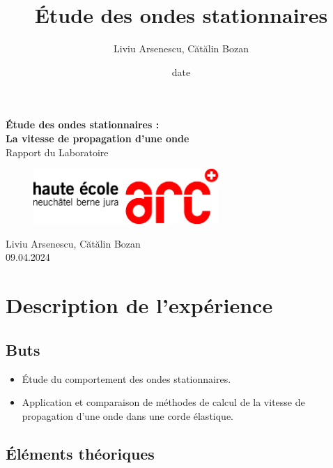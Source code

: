 \documentclass[12pt,a4paper]{article}
\title{Étude des ondes stationnaires}
\author{Liviu Arsenescu, Cătălin Bozan}
\date{date}
\begin{document}
    \begin{titlepage}
        \begin{center}
            \vspace*{\fill}
            \Huge \textbf{Étude des ondes stationnaires :} \\
            \Huge \textbf{La vitesse de propagation d'une onde} \\
            \Large Rapport du Laboratoire \\
            \begin{figure}[h]
                \centering
                \includegraphics[width=7cm]{hearclogo.png}
            \end{figure}
            \vspace{\fill}
            \Large Liviu Arsenescu, Cătălin Bozan \\
            09.04.2024

            \vspace*{\fill}
        \end{center}
    \end{titlepage}

    \thispagestyle{empty}
    \tableofcontents
    \newpage

    \section{Description de l'expérience}
    \subsection{Buts}
    \begin{itemize}
        \item Étude du comportement des ondes stationnaires.
        \item Application et comparaison de méthodes de calcul de la vitesse de propagation d'une onde dans une corde élastique.
    \end{itemize}

    \subsection{Éléments théoriques}
\end{document}
